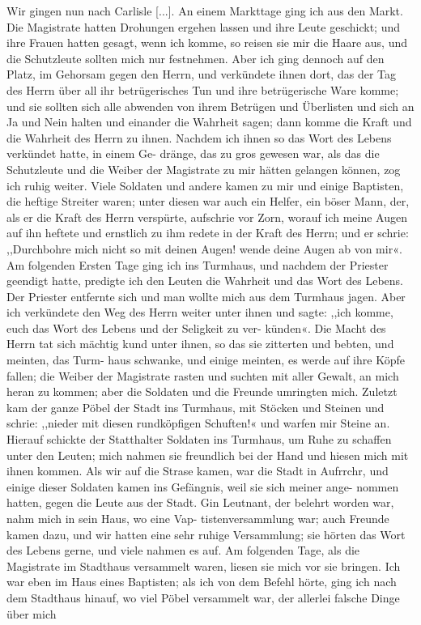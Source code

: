 Wir gingen nun nach Carlisle [...]. An einem Markttage
ging ich aus den Markt. Die Magistrate hatten Drohungen 
ergehen lassen und ihre Leute geschickt; und ihre Frauen hatten
gesagt, wenn ich komme, so reisen sie mir die Haare aus, und
die Schutzleute sollten mich nur festnehmen. Aber ich ging dennoch
auf den Platz, im Gehorsam gegen den Herrn, und verkündete
ihnen dort, das der Tag des Herrn über all ihr betrügerisches
Tun und ihre betrügerische Ware komme; und sie sollten sich alle
abwenden von ihrem Betrügen und Überlisten und sich an Ja
und Nein halten und einander die Wahrheit sagen; dann komme
die Kraft und die Wahrheit des Herrn zu ihnen. Nachdem ich
ihnen so das Wort des Lebens verkündet hatte, in einem Ge-
dränge, das zu gros gewesen war, als das die Schutzleute und
die Weiber der Magistrate zu mir hätten gelangen können, zog
ich ruhig weiter. Viele Soldaten und andere kamen zu mir und
einige Baptisten, die heftige Streiter waren; unter diesen war
auch ein Helfer, ein böser Mann, der, als er die Kraft des Herrn
verspürte, aufschrie vor Zorn, worauf ich meine Augen auf ihn
heftete und ernstlich zu ihm redete in der Kraft des Herrn; und
er schrie: ,,Durchbohre mich nicht so mit deinen Augen! wende
deine Augen ab von mir«.
Am folgenden Ersten Tage ging ich ins Turmhaus, und
nachdem der Priester geendigt hatte, predigte ich den Leuten
die Wahrheit und das Wort des Lebens. Der Priester entfernte
sich und man wollte mich aus dem Turmhaus jagen. Aber ich
verkündete den Weg des Herrn weiter unter ihnen und sagte:
,,ich komme, euch das Wort des Lebens und der Seligkeit zu ver-
künden«. Die Macht des Herrn tat sich mächtig kund unter
ihnen, so das sie zitterten und bebten, und meinten, das Turm-
haus schwanke, und einige meinten, es werde auf ihre Köpfe fallen;
die Weiber der Magistrate rasten und suchten mit aller Gewalt,
an mich heran zu kommen; aber die Soldaten und die Freunde
umringten mich. Zuletzt kam der ganze Pöbel der Stadt ins
Turmhaus, mit Stöcken und Steinen und schrie: ,,nieder mit
diesen rundköpfigen Schuften!« und warfen mir Steine an.
Hierauf schickte der Statthalter Soldaten ins Turmhaus, um
Ruhe zu schaffen unter den Leuten; mich nahmen sie freundlich
bei der Hand und hiesen mich mit ihnen kommen. Als wir
auf die Strase kamen, war die Stadt in Aufrrchr, und einige
dieser Soldaten kamen ins Gefängnis, weil sie sich meiner ange-
nommen hatten, gegen die Leute aus der Stadt. Gin Leutnant,
der belehrt worden war, nahm mich in sein Haus, wo eine Vap-
tistenversammlung war; auch Freunde kamen dazu, und wir hatten
eine sehr ruhige Versammlung; sie hörten das Wort des Lebens
gerne, und viele nahmen es auf. Am folgenden Tage, als die
Magistrate im Stadthaus versammelt waren, liesen sie mich vor
sie bringen. Ich war eben im Haus eines Baptisten; als ich
von dem Befehl hörte, ging ich nach dem Stadthaus hinauf, wo
viel Pöbel versammelt war, der allerlei falsche Dinge über mich


